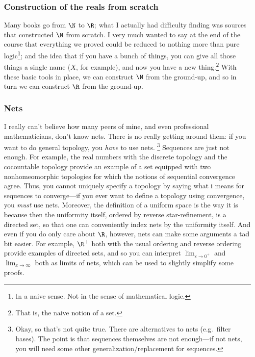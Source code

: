 \subsubsection{Construction of the reals from scratch}

Many books go from $\N$ to $\R$; what I actually had difficulty finding was sources that constructed $\N$ from scratch.  I very much wanted to say at the end of the course that everything we proved could be reduced to nothing more than pure logic\footnote{In a naive sense.  Not in the sense of mathematical logic.}; and the idea that if you have a bunch of things, you can give all those things a single name ($X$, for example), and now you have a new thing.\footnote{That is, the naive notion of a set.}  With these basic tools in place, we can construct $\N$ from the ground-up, and so in turn we can construct $\R$ from the ground-up.

\subsubsection{Nets}

I really can't believe how many peers of mine, and even professional mathematicians, don't know nets.  There is no really getting around them:  if you want to do general topology, you \emph{have} to use nets. \footnote{Okay, so that's not quite true.  There are alternatives to nets (e.g.~filter bases).  The point is that sequences themselves are not enough---if not nets, you will need some other generalization/replacement for sequences.} Sequences are just not enough.  For example, the real numbers with the discrete topology and the cocountable topology provide an example of a set equipped with two nonhomeomorphic topologies for which the notions of sequential convergence agree.  Thus, you cannot uniquely specify a topology by saying what i means for sequences to converge---if you ever want to define a topology using convergence, you \emph{must} use nets.  Moreover, the definition of a uniform space is the way it is because then the uniformity itself, ordered by reverse star-refinement, is a directed set, so that one can conveniently index nets by the uniformity itself.  And even if you do only care about $\R$, however, nets can make some arguments a tad bit easier.  For example, $\R ^+$ both with the usual ordering and reverse ordering provide examples of directed sets, and so you can interpret $\lim _{\varepsilon \to 0^+}$ and $\lim _{x\to \infty}$ both as limits of nets, which can be used to slightly simplify some proofs.

